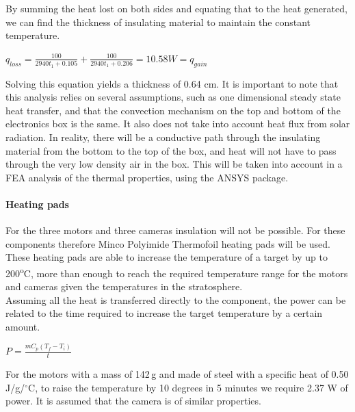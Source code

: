 By summing the heat lost on both sides and equating that to the heat generated, we can find the thickness of insulating material to maintain the constant temperature. \\

\begin{center}
 $q_{loss} = \frac{100}{2940t_{1}+0.105} + \frac{100}{2940t_{1}+0.206} = 10.58 W = q_{gain} $\\
\end{center}

Solving this equation yields a thickness of 0.64 cm. It is important to note that this analysis relies on several assumptions, such as one dimensional steady state heat transfer, and that the convection mechanism on the top and bottom of the electronics box is the same. It also does not take into account heat flux from solar radiation. In reality, there will be a conductive path through the insulating material from the bottom to the top of the box, and heat will not have to pass through the very low density air in the box. This will be taken into account in a FEA analysis of the thermal properties, using the ANSYS package. \\

\paragraph{Heating pads}
For the three motors and three cameras insulation will not be possible. For these components therefore Minco Polyimide Thermofoil heating pads will be used. These heating pads are able to increase the temperature of a target by up to 200\textsuperscript{o}C, more than enough to reach the required temperature range for the motors and cameras given the temperatures in the stratosphere.\\

Assuming all the heat is transferred directly to the component, the power can be related to the time required to increase the target temperature by a certain amount.

\begin{center}
 $P = \frac{mC_{p}(T_{f}-T_{i})}{t} $ \\
\end{center}

For the motors with a mass of 142\,g and made of steel with a specific heat of 0.50\,J/g/$^\circ$C, to raise the temperature by 10 degrees in 5 minutes we require 2.37 W of power. It is assumed that the camera is of similar properties. \\

